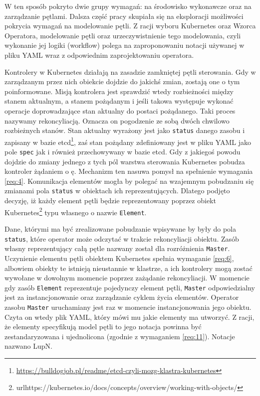 W ten sposób pokryto dwie grupy wymagań: na środowisko wykonawcze oraz na zarządzanie pętlami. Dalsza część pracy skupiała się na eksploracji możliwości pokrycia wymagań na modelowanie pętli. Z racji wyboru Kubernetes oraz Wzorca Operatora, modelowanie pętli oraz urzeczywistnienie tego modelowania, czyli wykonanie jej logiki (workflow) polega na zaproponowaniu notacji używanej w pliku YAML wraz z odpowiednim zaprojektowaniu operatora. 

Kontrolery w Kubernetes działają na zasadzie zamkniętej pętli sterowania. Gdy w zarządzanym przez nich obiekcie dojdzie do jakichś zmian, zostają one o tym poinformowane. Misją kontrolera jest sprawdzić wtedy rozbieżności między stanem aktualnym, a stanem pożądanym i jeśli takowa występuje wykonać operacje doprowadzające stan aktualny do postaci pożądanego. Taki proces nazywamy rekoncyliacją. Oznacza on pogodzenie ze sobą dwóch chwilowo rozbieżnych stanów. Stan aktualny wyrażony jest jako \texttt{status} danego zasobu i zapisany w bazie etcd\footnote{\url{https://bulldogjob.pl/readme/etcd-czyli-mozg-klastra-kubernetes}}, zaś stan pożądany zdefiniowany jest w pliku YAML jako pole \texttt{spec} jak i również przechowywany w bazie etcd. Gdy z jakiegoś powodu dojdzie do zmiany jednego z tych pól warstwa sterowania Kubernetes pobudza kontroler żądaniem o ę. Mechanizm ten nasuwa pomysł na spełnienie wymagania \ref{req:4}. Komunikacja elementów mogła by polegać na wzajemnym pobudzaniu się zmianami pola \texttt{status} w obiektach ich reprezentujących. Dlatego podjęto decyzję, iż każdy element pętli będzie reprezentowany poprzez obiekt Kubernetes\footnote{url{https://kubernetes.io/docs/concepts/overview/working-with-objects/}} typu własnego o nazwie \texttt{Element}.

Dane, którymi ma być zrealizowane pobudzanie wpisywane by były do pola \texttt{status}, które operator może odczytać w trakcie rekoncyliacji obiektu. Zasób własny reprezentujący całą pętle nazwany został dla rozróżnienia \texttt{Master}. Uczynienie elementu pętli obiektem Kubernetes spełnia wymaganie \ref{req:6}, albowiem obiekty te istnieją nieustannie w klastrze, a ich kontrolery mogą zostać wywołane w dowolnym momencie poprzez zażądanie rekoncyliacji. W momencie gdy zasób \texttt{Element} reprezentuje pojedynczy element pętli, \texttt{Master} odpowiedzialny jest za instancjonowanie oraz zarządzanie cyklem życia elementów. Operator zasobu \texttt{Master} uruchamiany jest raz w momencie instancjonowania jego obiektu. Czyta on wtedy plik YAML, który mówi mu jakie elementy ma utworzyć. Z racji, że elementy specyfikują model pętli to jego notacja powinna być zestandaryzowana i ujednolicona (zgodnie z wymaganiem \ref{req:11}). Notacje nazwano LupN. 

